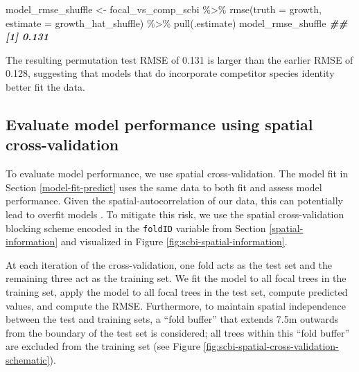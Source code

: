 \documentclass[12pt]{article}
\newenvironment{Shaded}{\begin{snugshade}}{\end{snugshade}}
\newcommand{\AttributeTok}[1]{\textcolor[rgb]{0.77,0.63,0.00}{#1}}
\newcommand{\DocumentationTok}[1]{\textcolor[rgb]{0.56,0.35,0.01}{\textbf{\textit{#1}}}}
\newcommand{\FunctionTok}[1]{\textcolor[rgb]{0.00,0.00,0.00}{#1}}
\newcommand{\NormalTok}[1]{#1}
\newcommand{\OtherTok}[1]{\textcolor[rgb]{0.56,0.35,0.01}{#1}}
\newcommand{\SpecialCharTok}[1]{\textcolor[rgb]{0.00,0.00,0.00}{#1}}
\begin{document}
\begin{Shaded}
\begin{Highlighting}[]
\NormalTok{model\_rmse\_shuffle }\OtherTok{\textless{}{-}}\NormalTok{ focal\_vs\_comp\_scbi }\SpecialCharTok{\%\textgreater{}\%}
    \FunctionTok{rmse}\NormalTok{(}\AttributeTok{truth =}\NormalTok{ growth, }\AttributeTok{estimate =}\NormalTok{ growth\_hat\_shuffle) }\SpecialCharTok{\%\textgreater{}\%}
    \FunctionTok{pull}\NormalTok{(.estimate)}
\NormalTok{model\_rmse\_shuffle}
\DocumentationTok{\#\# [1] 0.131}
\end{Highlighting}
\end{Shaded}

The resulting permutation test RMSE of 0.131 is larger than the earlier
RMSE of 0.128, suggesting that models that do incorporate competitor
species identity better fit the data.

\hypertarget{spatial-cross-validation}{%
\subsection{Evaluate model performance using spatial
cross-validation}\label{spatial-cross-validation}}

To evaluate model performance, we use spatial cross-validation. The
model fit in Section \ref{model-fit-predict} uses the same data to both
fit and assess model performance. Given the spatial-autocorrelation of
our data, this can potentially lead to overfit models
\citep{roberts_cross-validation_2017}. To mitigate this risk, we use the
spatial cross-validation blocking scheme encoded in the \texttt{foldID}
variable from Section \ref{spatial-information} and visualized in Figure
\ref{fig:scbi-spatial-information}.

At each iteration of the cross-validation, one fold acts as the test set
and the remaining three act as the training set. We fit the model to all
focal trees in the training set, apply the model to all focal trees in
the test set, compute predicted values, and compute the RMSE.
Furthermore, to maintain spatial independence between the test and
training sets, a ``fold buffer'' that extends 7.5m outwards from the
boundary of the test set is considered; all trees within this ``fold
buffer'' are excluded from the training set (see Figure
\ref{fig:scbi-spatial-cross-validation-schematic}).
\end{document}
